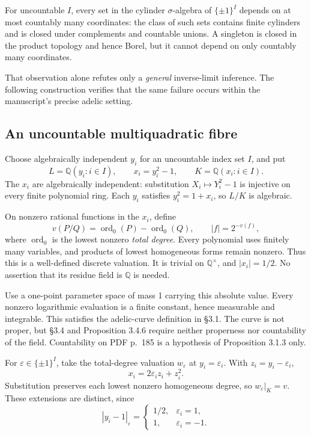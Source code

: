 \documentclass[11pt,a4paper]{article}
\newcommand{\Q}{\mathbb Q}
\begin{document}
For uncountable $I$, every set in the cylinder $\sigma$-algebra of $\{\pm1\}^I$ depends on at most countably many coordinates: the class of such sets contains finite cylinders and is closed under complements and countable unions. A singleton is closed in the product topology and hence Borel, but it cannot depend on only countably many coordinates.

That observation alone refutes only a \emph{general} inverse-limit inference. The following construction verifies that the same failure occurs within the manuscript's precise adelic setting.

\subsection{An uncountable multiquadratic fibre}
Choose algebraically independent $y_i$ for an uncountable index set $I$, and put
\[
 L=\Q(y_i:i\in I),\qquad x_i=y_i^2-1,\qquad K=\Q(x_i:i\in I).
\]
The $x_i$ are algebraically independent: substitution $X_i\mapsto Y_i^2-1$ is injective on every finite polynomial ring. Each $y_i$ satisfies $y_i^2=1+x_i$, so $L/K$ is algebraic.

On nonzero rational functions in the $x_i$, define
\[
 v(P/Q)=\operatorname{ord}_0(P)-\operatorname{ord}_0(Q),\qquad |f|=2^{-v(f)},
\]
where $\operatorname{ord}_0$ is the lowest nonzero \emph{total degree}. Every polynomial uses finitely many variables, and products of lowest homogeneous forms remain nonzero. Thus this is a well-defined discrete valuation. It is trivial on $\Q^\times$, and $|x_i|=1/2$. No assertion that its residue field is $\Q$ is needed.

Use a one-point parameter space of mass 1 carrying this absolute value. Every nonzero logarithmic evaluation is a finite constant, hence measurable and integrable. This satisfies the adelic-curve definition in \S3.1. The curve is not proper, but \S3.4 and Proposition 3.4.6 require neither properness nor countability of the field. Countability on PDF p.~185 is a hypothesis of Proposition 3.1.3 only.

For $\varepsilon\in\{\pm1\}^I$, take the total-degree valuation $w_\varepsilon$ at $y_i=\varepsilon_i$. With $z_i=y_i-\varepsilon_i$,
\[
 x_i=2\varepsilon_i z_i+z_i^2.
\]
Substitution preserves each lowest nonzero homogeneous degree, so $w_\varepsilon|_K=v$. These extensions are distinct, since
\[
 |y_i-1|_\varepsilon=
 \begin{cases}1/2,&\varepsilon_i=1,\\1,&\varepsilon_i=-1.\end{cases}
\]
\end{document}
